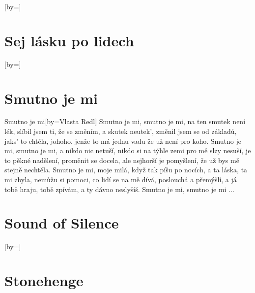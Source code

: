 \documentclass{article}
\begin{document}
\begin{songs}{}
\begin{song}{}[by={}]
\endverse
\end{song}

\section{Sej lásku po lidech}
\begin{song}{}[by={}]
\beginverse

\endverse
\end{song}

\section{Smutno je mi}

\begin{song}{Smutno je mi}[by={Vlasta Redl}]
\beginverse
Smutno je mi, smutno je mi, na ten smutek není lék,
slíbil jsem ti, že se změním, a skutek neutek',
změnil jsem se od základů, jaks' to chtěla, johoho,
jenže to má jednu vadu že už není pro koho.
\endverse
\beginverse
Smutno je mi, smutno je mi, a nikdo nic netuší,
nikdo si na týhle zemi pro mě slzy nesuší,
je to pěkné nadělení, proměnit se docela,
ale nejhorší je pomyšlení, že už bys mě stejně nechtěla.
\endverse
\beginverse
Smutno je mi, moje milá, když tak píšu po nocích,
a ta láska, ta mi zbyla, nemůžu si pomoci,
co lidí se na mě dívá, poslouchá a přemýšlí,
a já tobě hraju, tobě zpívám, a ty dávno neslyšíš.
Smutno je mi, smutno je mi ... 
\endverse
\end{song}

\section{Sound of Silence}
\begin{song}{}[by={}]
\beginverse

\endverse
\end{song}

\section{Stonehenge}


\end{songs}
\end{document}
